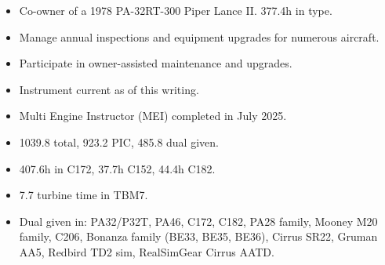 
\begin{itemize} \itemsep -2pt
\item Co-owner of a 1978 PA-32RT-300 Piper Lance II. 377.4h in type.
\item Manage annual inspections and equipment upgrades for numerous aircraft.
\item Participate in owner-assisted maintenance and upgrades.
\item Instrument current as of this writing.
\item Multi Engine Instructor (MEI) completed in July 2025.
\item 1039.8 total, 923.2 PIC, 485.8 dual given.
\item 407.6h in C172, 37.7h C152, 44.4h C182.
\item 7.7 turbine time in TBM7.
\item Dual given in: PA32/P32T, PA46, C172, C182, PA28 family, Mooney M20 family, C206, Bonanza family (BE33, BE35, BE36), Cirrus SR22, Gruman AA5, Redbird TD2 sim, RealSimGear Cirrus AATD.

\end{itemize}
